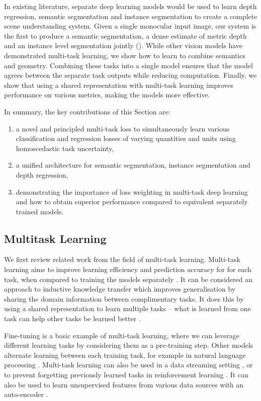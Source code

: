 In existing literature, separate deep learning models would be used to learn depth regression, semantic segmentation and instance segmentation to create a complete scene understanding system. Given a single monocular input image, our system is the first to produce a semantic segmentation, a dense estimate of metric depth and an instance level segmentation jointly (). While other vision models have demonstrated multi-task learning, we show how to learn to combine semantics and geometry. Combining these tasks into a single model ensures that the model agrees between the separate task outputs while reducing computation. Finally, we show that using a shared representation with multi-task learning improves performance on various metrics, making the models more effective.

In summary, the key contributions of this Section are:
\begin{enumerate}
\item a novel and principled multi-task loss to simultaneously learn various classification and regression losses of varying quantities and units using homoscedastic task uncertainty,
\item a unified architecture for semantic segmentation, instance segmentation and depth regression,
\item demonstrating the importance of loss weighting in multi-task deep learning and how to obtain superior performance compared to equivalent separately trained models.
\end{enumerate}

\subsection{Multitask Learning}

We first review related work from the field of multi-task learning. Multi-task learning aims to improve learning efficiency and prediction accuracy for for each task, when compared to training the models separately \citep{thrun1996learning,baxter2000model}. It can be considered an approach to inductive knowledge transfer which improves generalisation by sharing the domain information between complimentary tasks. It does this by using a shared representation to learn multiple tasks -- what is learned from one task can help other tasks be learned better \citep{caruana1998multitask}.

Fine-tuning \citep{agrawal2015learning,oquab2014learning} is a basic example of multi-task learning, where we can leverage different learning tasks by considering them as a pre-training step.
Other models alternate learning between each training task, for example in natural language processing \citep{collobert2008unified}.
Multi-task learning can also be used in a data streaming setting \citep{thrun1996learning}, or to prevent forgetting previously learned tasks in reinforcement learning \citep{kirkpatrick2017overcoming}. It can also be used to learn unsupervised features from various data sources with an auto-encoder \citep{ngiam2011multimodal}.


